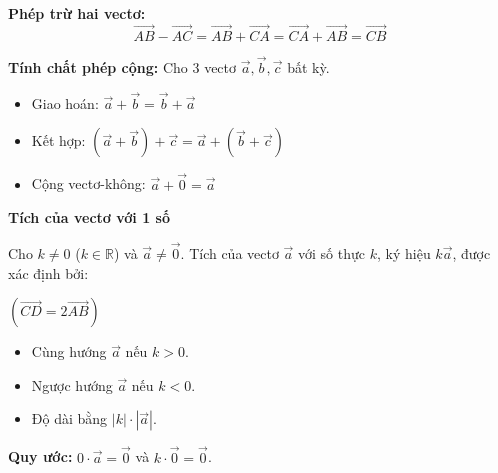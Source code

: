 \documentclass[12pt,a4paper]{extarticle}
\begin{document}
    \item \textbf{Phép trừ hai vectơ:}
    \[
    \vec{AB} - \vec{AC} = \vec{AB} + \vec{CA} = \vec{CA} + \vec{AB} = \vec{CB}
    \]

    \item \textbf{Tính chất phép cộng:} Cho 3 vectơ $\vec{a}, \vec{b}, \vec{c}$ bất kỳ.
    \begin{itemize}[label=$\bullet$, leftmargin=1.5cm, itemsep=0.3em]
        \item Giao hoán: $\vec{a} + \vec{b} = \vec{b} + \vec{a}$
        \item Kết hợp: $(\vec{a} + \vec{b}) + \vec{c} = \vec{a} + (\vec{b} + \vec{c})$
        \item Cộng vectơ-không: $\vec{a} + \vec{0} = \vec{a}$
    \end{itemize}

    \item \textbf{Tích của vectơ với 1 số}
    \par Cho $k \neq 0$ ($k \in \mathbb{R}$) và $\vec{a} \neq \vec{0}$. Tích của vectơ $\vec{a}$ với số thực $k$, ký hiệu $k\vec{a}$, được xác định bởi:
    \begin{center}
        \begin{minipage}{0.48\textwidth}
            \centering
            \par\vspace{0.1cm}
            $\left(\vec{CD} = 2\vec{AB}\right)$
        \end{minipage}
        \hfill
        \begin{minipage}{0.48\textwidth}
            \begin{itemize}[label=$\bullet$, leftmargin=*, itemsep=0.3em]
                \item Cùng hướng $\vec{a}$ nếu $k > 0$.
                \item Ngược hướng $\vec{a}$ nếu $k < 0$.
                \item Độ dài bằng $|k| \cdot |\vec{a}|$.
            \end{itemize}
        \end{minipage}
    \end{center}
    \textbf{Quy ước:} $0 \cdot \vec{a} = \vec{0}$ và $k \cdot \vec{0} = \vec{0}$.
\end{document}
